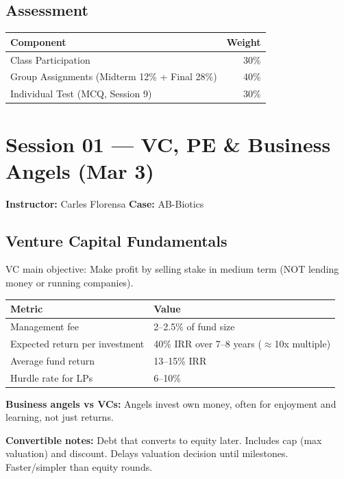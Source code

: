 \documentclass[a4paper,11pt]{article}
\begin{document}
\subsection{Assessment}

\begin{tabular}{@{}lr@{}}
\toprule
\textbf{Component} & \textbf{Weight} \\
\midrule
Class Participation & 30\% \\
Group Assignments (Midterm 12\% + Final 28\%) & 40\% \\
Individual Test (MCQ, Session 9) & 30\% \\
\bottomrule
\end{tabular}

\newpage

\section{Session 01 --- VC, PE \& Business Angels (Mar 3)}
\textbf{Instructor:} Carles Florensa \hfill \textbf{Case:} AB-Biotics

\subsection{Venture Capital Fundamentals}

VC main objective: Make profit by selling stake in medium term (NOT lending money or running companies).

\begin{tabular}{@{}ll@{}}
\toprule
\textbf{Metric} & \textbf{Value} \\
\midrule
Management fee & 2--2.5\% of fund size \\
Expected return per investment & 40\% IRR over 7--8 years ($\approx$10x multiple) \\
Average fund return & 13--15\% IRR \\
Hurdle rate for LPs & 6--10\% \\
\bottomrule
\end{tabular}

\vspace{4pt}
\textbf{Business angels vs VCs:} Angels invest own money, often for enjoyment and learning, not just returns.

\textbf{Convertible notes:} Debt that converts to equity later. Includes cap (max valuation) and discount. Delays valuation decision until milestones. Faster/simpler than equity rounds.
\end{document}
